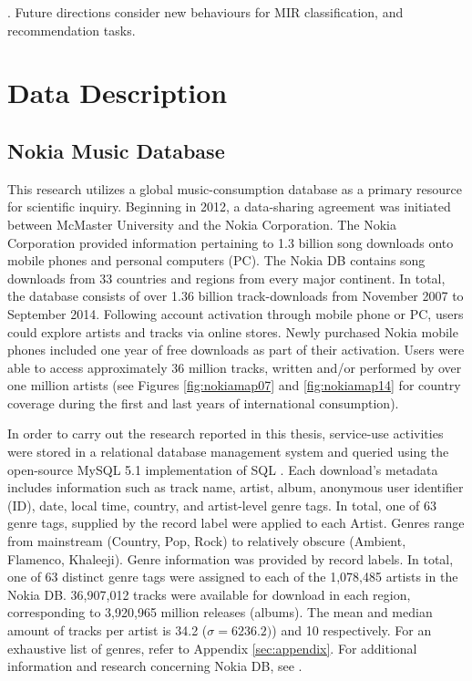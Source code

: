 \documentclass[a4paper]{article}
\begin{document}
\cite{peterson1992seven,warde2007understanding}. Future directions consider new behaviours for MIR classification, and recommendation tasks.

\newpage

\section{Data Description}
\subsection{Nokia Music Database}\label{sec:nokia}
This research utilizes a global music-consumption database as a primary resource for scientific inquiry. Beginning in 2012, a data-sharing agreement was initiated between McMaster University and the Nokia Corporation. The Nokia Corporation provided information pertaining to 1.3 billion song downloads onto mobile phones and personal computers (PC). The Nokia DB contains song downloads from 33 countries and regions from every major continent. In total, the database consists of over 1.36 billion track-downloads from November 2007 to September 2014. Following account activation through mobile phone or PC, users could explore artists and tracks via online stores. Newly purchased Nokia mobile phones included one year of free downloads as part of their activation. Users were able to access approximately 36 million tracks, written and/or performed by over one million artists (see Figures \ref{fig:nokiamap07} and \ref{fig:nokiamap14} for country coverage during the first and last years of international consumption).

In order to carry out the research reported in this thesis, service-use activities were stored in a relational database management system and queried using the open-source MySQL 5.1 implementation of SQL \cite{groff2002sql}. Each download’s metadata includes information such as track name, artist, album, anonymous user identifier (ID), date, local time, country, and artist-level genre tags. In total, one of 63 genre tags, supplied by the record label were applied to each Artist. Genres range from mainstream (Country, Pop, Rock) to relatively obscure (Ambient, Flamenco, Khaleeji). Genre information was provided by record labels. In total, one of 63 distinct genre tags were assigned to each of the 1,078,485 artists in the Nokia DB. 36,907,012 tracks were available for download in each region, corresponding to 3,920,965 million releases (albums). The mean and median amount of tracks per artist is 34.2 ($\sigma = 6236.2)$) and 10 respectively. For an exhaustive list of genres, refer to Appendix \ref{sec:appendix}. For additional information and research concerning Nokia DB, see \cite{woolhouse2013work,woolhouse2014every,Woolhouse2015,woolhouse2016generalizing,barone2017leaky}.
\end{document}
